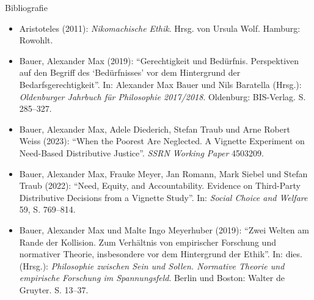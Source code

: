 \documentclass[xcolor=table,9pt,aspectratio=169]{beamer}
\begin{document}
\begin{frame}{\vspace*{10mm}Bibliografie}
\vspace*{-10mm}
{\footnotesize
\begin{itemize}[label=,leftmargin=2em,itemindent=-2em]
   \item Aristoteles (2011): \textit{Nikomachische Ethik}. Hrsg. von Ursula Wolf. Hamburg: Rowohlt.
   \item Bauer, Alexander Max (2019): \enquote{Gerechtigkeit und Bedürfnis. Perspektiven auf den Begriff des \enquote{Bedürfnisses} vor dem Hintergrund der Bedarfsgerechtigkeit}. In: Alexander Max Bauer und Nils Baratella (Hrsg.): \textit{Oldenburger Jahrbuch für Philosophie 2017/2018}. Oldenburg: BIS-Verlag. S. 285--327.
   \item Bauer, Alexander Max, Adele Diederich, Stefan Traub und Arne Robert Weiss (2023): \enquote{When the Poorest Are Neglected. A Vignette Experiment on Need-Based Distributive Justice}. \textit{SSRN Working Paper} 4503209.
   \item Bauer, Alexander Max, Frauke Meyer, Jan Romann, Mark Siebel und Stefan Traub (2022): \enquote{Need, Equity, and Accountability. Evidence on Third-Party Distributive Decisions from a Vignette Study}. In: \textit{Social Choice and Welfare} 59, S. 769--814.
   \item Bauer, Alexander Max und Malte Ingo Meyerhuber (2019): \enquote{Zwei Welten am Rande der Kollision. Zum Verhältnis von empirischer Forschung und normativer Theorie, insbesondere vor dem Hintergrund der Ethik}. In: dies. (Hrsg.): \textit{Philosophie zwischen Sein und Sollen. Normative Theorie und empirische Forschung im Spannungsfeld}. Berlin und Boston: Walter de Gruyter. S. 13--37.
\end{itemize}
}
\end{frame}
\end{document}

